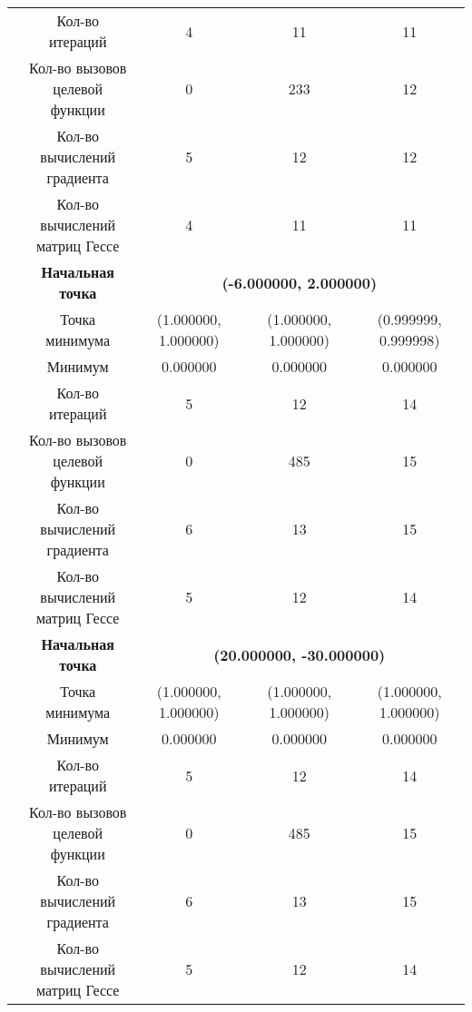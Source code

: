 \begin{table}[H]
\begin{tabular}{|c|c|c|c|c|}
	\cline{2-5}
	&Кол-во итераций &4 &11 &11 \\ 
	\cline{2-5}
	&\makecell{Кол-во вызовов\\целевой функции} &0 &233 &12 \\ 
	\cline{2-5}
	&\makecell{Кол-во вычислений\\градиента} &5 &12 &12 \\ 
	\cline{2-5}
	&\makecell{Кол-во вычислений\\матриц Гессе} &4 &11 &11 \\ 
	\cline{2-5}
	\hline
	\multirow{12}{*}{\rotatebox[origin=c]{90}{$\varepsilon = 1e-06$}}&\textbf{Начальная точка} &\multicolumn{3}{c|}{\textbf{(-6.000000, 2.000000)}}\\
	\cline{2-5}
	&Точка минимума &(1.000000, 1.000000) &(1.000000, 1.000000) &(0.999999, 0.999998) \\ 
	\cline{2-5}
	&Минимум &0.000000 &0.000000 &0.000000 \\ 
	\cline{2-5}
	&Кол-во итераций &5 &12 &14 \\ 
	\cline{2-5}
	&\makecell{Кол-во вызовов\\целевой функции} &0 &485 &15 \\ 
	\cline{2-5}
	&\makecell{Кол-во вычислений\\градиента} &6 &13 &15 \\ 
	\cline{2-5}
	&\makecell{Кол-во вычислений\\матриц Гессе} &5 &12 &14 \\ 
	\cline{2-5}
\cline{2-5}&\textbf{Начальная точка} &\multicolumn{3}{c|}{\textbf{(20.000000, -30.000000)}}\\
	\cline{2-5}
	&Точка минимума &(1.000000, 1.000000) &(1.000000, 1.000000) &(1.000000, 1.000000) \\ 
	\cline{2-5}
	&Минимум &0.000000 &0.000000 &0.000000 \\ 
	\cline{2-5}
	&Кол-во итераций &5 &12 &14 \\ 
	\cline{2-5}
	&\makecell{Кол-во вызовов\\целевой функции} &0 &485 &15 \\ 
	\cline{2-5}
	&\makecell{Кол-во вычислений\\градиента} &6 &13 &15 \\ 
	\cline{2-5}
	&\makecell{Кол-во вычислений\\матриц Гессе} &5 &12 &14 \\ 
	\cline{2-5}
	\hline

\end{tabular}
\end{table}


